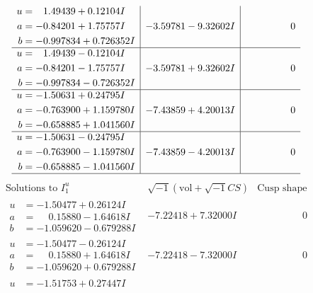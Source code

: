 \documentclass[1p]{elsarticle_modified}
\theoremstyle{definition}
\newcommand{\I}{\sqrt{-1}}
\begin{document}
$$\begin{array}{c|c|c}
\begin{aligned}
u &= \phantom{-}1.49439 + 0.12104 I \\
a &= -0.84201 + 1.75757 I \\
b &= -0.997834 + 0.726352 I\end{aligned}
 & -3.59781 - 9.32602 I & \phantom{-0.000000 } 0 \\ \hline\begin{aligned}
u &= \phantom{-}1.49439 - 0.12104 I \\
a &= -0.84201 - 1.75757 I \\
b &= -0.997834 - 0.726352 I\end{aligned}
 & -3.59781 + 9.32602 I & \phantom{-0.000000 } 0 \\ \hline\begin{aligned}
u &= -1.50631 + 0.24795 I \\
a &= -0.763900 + 1.159780 I \\
b &= -0.658885 + 1.041560 I\end{aligned}
 & -7.43859 + 4.20013 I & \phantom{-0.000000 } 0 \\ \hline\begin{aligned}
u &= -1.50631 - 0.24795 I \\
a &= -0.763900 - 1.159780 I \\
b &= -0.658885 - 1.041560 I\end{aligned}
 & -7.43859 - 4.20013 I & \phantom{-0.000000 } 0\\
 \hline 
 \end{array}$$\newpage$$\begin{array}{c|c|c}  
\text{Solutions to }I^u_{1}& \I (\text{vol} + \sqrt{-1}CS) & \text{Cusp shape}\\
 \hline 
\begin{aligned}
u &= -1.50477 + 0.26124 I \\
a &= \phantom{-}0.15880 - 1.64618 I \\
b &= -1.059620 - 0.679288 I\end{aligned}
 & -7.22418 + 7.32000 I & \phantom{-0.000000 } 0 \\ \hline\begin{aligned}
u &= -1.50477 - 0.26124 I \\
a &= \phantom{-}0.15880 + 1.64618 I \\
b &= -1.059620 + 0.679288 I\end{aligned}
 & -7.22418 - 7.32000 I & \phantom{-0.000000 } 0 \\ \hline\begin{aligned}
u &= -1.51753 + 0.27447 I \\

\end{aligned}
\end{array}$$
\end{document}
